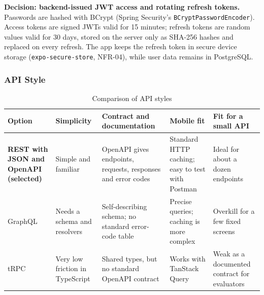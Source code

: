 \endgroup

\noindent\textbf{Decision: backend-issued JWT access and rotating refresh tokens.} Passwords are hashed with BCrypt (Spring Security's \texttt{BCryptPasswordEncoder}). Access tokens are signed JWTs valid for 15 minutes; refresh tokens are random values valid for 30 days, stored on the server only as SHA-256 hashes and replaced on every refresh. The app keeps the refresh token in secure device storage (\texttt{expo-secure-store}, NFR-04), while user data remains in PostgreSQL.


\subsubsection{API Style}

\begingroup

\footnotesize

\begin{longtable}{|>{\raggedright\arraybackslash}p{2.6cm}|>{\raggedright\arraybackslash}p{2.95cm}|>{\raggedright\arraybackslash}p{2.95cm}|>{\raggedright\arraybackslash}p{2.95cm}|>{\raggedright\arraybackslash}p{2.95cm}|}

\caption{Comparison of API styles}\label{tab:tech-api}\\

\hline

\textbf{Option} & \textbf{Simplicity} & \textbf{Contract and documentation} & \textbf{Mobile fit} & \textbf{Fit for a small API} \\ \hline

\textbf{REST with JSON and OpenAPI (selected)} & Simple and familiar &

OpenAPI gives endpoints, requests, responses and error codes &

Standard HTTP caching; easy to test with Postman &

Ideal for about a dozen endpoints \\ \hline

GraphQL & Needs a schema and resolvers &

Self-describing schema; no standard error-code table &

Precise queries; caching is more complex &

Overkill for a few fixed screens \\ \hline

tRPC & Very low friction in TypeScript &

Shared types, but no standard OpenAPI contract &

Works with TanStack Query &

Weak as a documented contract for evaluators \\ \hline

\end{longtable}

